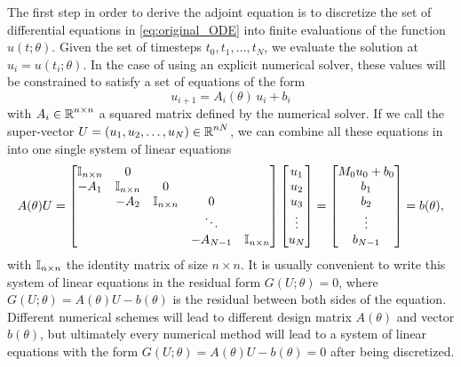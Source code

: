 The first step in order to derive the adjoint equation is to discretize the set of differential equations in \eqref{eq:original_ODE} into finite evaluations of the function $u(t; \theta)$. 
Given the set of timesteps $t_0, t_1, \ldots, t_N$, we evaluate the solution at $u_i = u(t_i; \theta)$. 
In the case of using an explicit numerical solver, these values will be constrained to satisfy a set of equations of the form 
\begin{equation}
    u_{i+1} = A_i (\theta) \, u_i + b_i
\end{equation}
with $A_i \in \operatorname{\mathbb{R}}^{n \times n}$ a squared matrix defined by the numerical solver. 
If we call the super-vector $U = (u_1, u_2, \ldots, u_N) \in \operatorname{\mathbb{R}}^{nN}$, we can combine all these equations in into one single system of linear equations 
\begin{equation}
    A(\theta) U 
    = 
    \begin{bmatrix}
        \operatorname{\mathbb{I}}_{n \times n} & 0 &   &  & \\
        -A_1 & \operatorname{\mathbb{I}}_{n \times n} & 0 &  &  \\
          & -A_2 & \operatorname{\mathbb{I}}_{n \times n} & 0 &  \\
         &  &   & \ddots &   \\
         &  &  & -A_{N-1} & \operatorname{\mathbb{I}}_{n \times n}
    \end{bmatrix}
    \begin{bmatrix}
        u_1 \\
        u_2 \\
        u_3 \\
        \vdots \\
        u_N
    \end{bmatrix}
    = 
    \begin{bmatrix}
        M_0 u_0 + b_0 \\
        b_1 \\
        b_2 \\
        \vdots \\
        b_{N-1}
    \end{bmatrix}
    = 
    b(\theta), 
\end{equation}
with $\operatorname{\mathbb{I}}_{n \times n}$ the identity matrix of size $n \times n$.
It is usually convenient to write this system of linear equations in the residual form $G(U; \theta) = 0$, where $G(U; \theta) = A(\theta) U - b(\theta)$ is the residual between both sides of the equation. 
Different numerical schemes will lead to different design matrix $A(\theta)$ and vector $b(\theta)$, but ultimately every numerical method will lead to a system of linear equations with the form $G(U; \theta) = A(\theta) U - b(\theta) = 0$ after being discretized. 

